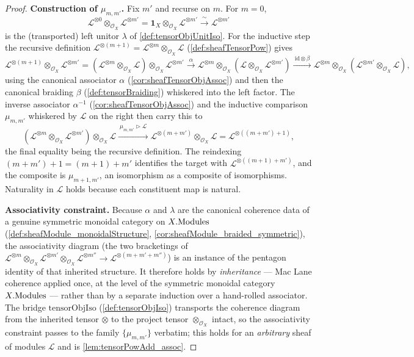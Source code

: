 \begin{proof}
  \textbf{Construction of \(\mu_{m,m'}\).} Fix \(m'\) and recurse on \(m\). For
  \(m = 0\),
  \[
    \mathcal{L}^{\otimes 0} \otimes_{\mathcal{O}_X} \mathcal{L}^{\otimes m'}
      = \mathbf{1}_X \otimes_{\mathcal{O}_X} \mathcal{L}^{\otimes m'}
      \xrightarrow{\ \sim\ } \mathcal{L}^{\otimes m'}
  \]
  is the (transported) left unitor \(\lambda\) of \cref{def:tensorObjUnitIso}. For
  the inductive step the recursive definition
  \(\mathcal{L}^{\otimes (m+1)} = \mathcal{L}^{\otimes m} \otimes_{\mathcal{O}_X}
  \mathcal{L}\) (\cref{def:sheafTensorPow}) gives
  \[
    \mathcal{L}^{\otimes (m+1)} \otimes_{\mathcal{O}_X} \mathcal{L}^{\otimes m'}
    = (\mathcal{L}^{\otimes m} \otimes_{\mathcal{O}_X} \mathcal{L})
      \otimes_{\mathcal{O}_X} \mathcal{L}^{\otimes m'}
    \xrightarrow{\ \alpha\ } \mathcal{L}^{\otimes m} \otimes_{\mathcal{O}_X}
      (\mathcal{L} \otimes_{\mathcal{O}_X} \mathcal{L}^{\otimes m'})
    \xrightarrow{\ \mathrm{id} \otimes \beta\ } \mathcal{L}^{\otimes m}
      \otimes_{\mathcal{O}_X}
      (\mathcal{L}^{\otimes m'} \otimes_{\mathcal{O}_X} \mathcal{L}),
  \]
  using the canonical associator \(\alpha\) (\cref{cor:sheafTensorObjAssoc}) and
  then the canonical braiding \(\beta\) (\cref{def:tensorBraiding}) whiskered into
  the left factor. The inverse associator \(\alpha^{-1}\)
  (\cref{cor:sheafTensorObjAssoc}) and the inductive comparison \(\mu_{m,m'}\)
  whiskered by \(\mathcal{L}\) on the right then carry this to
  \[
    (\mathcal{L}^{\otimes m} \otimes_{\mathcal{O}_X} \mathcal{L}^{\otimes m'})
      \otimes_{\mathcal{O}_X} \mathcal{L}
    \xrightarrow{\ \mu_{m,m'} \rhd \mathcal{L}\ }
    \mathcal{L}^{\otimes (m + m')} \otimes_{\mathcal{O}_X} \mathcal{L}
    = \mathcal{L}^{\otimes ((m + m') + 1)},
  \]
  the final equality being the recursive definition. The reindexing
  \((m + m') + 1 = (m + 1) + m'\) identifies the target with
  \(\mathcal{L}^{\otimes ((m+1) + m')}\), and the composite is
  \(\mu_{m+1,m'}\), an isomorphism as a composite of isomorphisms. Naturality in
  \(\mathcal{L}\) holds because each constituent map is natural.

  \textbf{Associativity constraint.} Because \(\alpha\) and \(\lambda\) are the
  canonical coherence data of a genuine symmetric monoidal category on
  \(X.\mathrm{Modules}\) (\cref{def:sheafModule_monoidalStructure},
  \cref{cor:sheafModule_braided_symmetric}), the associativity diagram (the two
  bracketings of \(\mathcal{L}^{\otimes m} \otimes_{\mathcal{O}_X}
  \mathcal{L}^{\otimes m'} \otimes_{\mathcal{O}_X} \mathcal{L}^{\otimes m''} \to
  \mathcal{L}^{\otimes (m+m'+m'')}\)) is an instance of the pentagon identity of
  that inherited structure. It therefore holds by \emph{inheritance} --- Mac Lane
  coherence applied once, at the level of the symmetric monoidal category
  \(X.\mathrm{Modules}\) --- rather than by a separate induction over a hand-rolled
  associator. The bridge \(\mathrm{tensorObjIso}\) (\cref{def:tensorObjIso})
  transports the coherence diagram from the inherited tensor \(\otimes\) to the
  project tensor \(\otimes_{\mathcal{O}_X}\) intact, so the associativity
  constraint passes to the family \(\{\mu_{m,m'}\}\) verbatim; this holds for an
  \emph{arbitrary} sheaf of modules \(\mathcal{L}\) and is \cref{lem:tensorPowAdd_assoc}.


\end{proof}
